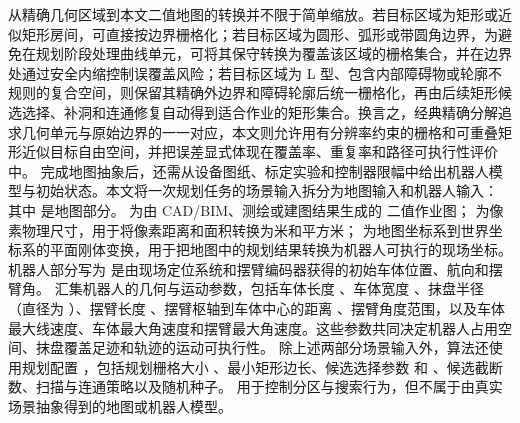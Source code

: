 {}从精确几何区域到本文二值地图的转换并不限于简单缩放。若目标区域为矩形或近似矩形房间，可直接按边界栅格化；若目标区域为圆形、弧形或带圆角边界，为避免在规划阶段处理曲线单元，可将其保守转换为覆盖该区域的栅格集合，并在边界处通过安全内缩控制误覆盖风险；若目标区域为 L 型、包含内部障碍物或轮廓不规则的复合空间，则保留其精确外边界和障碍轮廓后统一栅格化，再由后续矩形候选选择、补洞和连通修复自动得到适合作业的矩形集合。换言之，经典精确分解追求几何单元与原始边界的一一对应，本文则允许用有分辨率约束的栅格和可重叠矩形近似目标自由空间，并把误差显式体现在覆盖率、重复率和路径可执行性评价中。\markdownRendererInterblockSeparator
{}\markdownRendererParagraphSeparator
{}完成地图抽象后，还需从设备图纸、标定实验和控制器限幅中给出机器人模型与初始状态。本文将一次规划任务的场景输入拆分为地图输入和机器人输入：\markdownRendererParagraphSeparator
{}\markdownRendererParagraphSeparator
{}其中\markdownRendererParagraphSeparator
{}\markdownRendererParagraphSeparator
{}是地图部分。 为由 CAD/BIM、测绘或建图结果生成的  二值作业图； 为像素物理尺寸，用于将像素距离和面积转换为米和平方米； 为地图坐标系到世界坐标系的平面刚体变换，用于把地图中的规划结果转换为机器人可执行的现场坐标。\markdownRendererParagraphSeparator
{}机器人部分写为\markdownRendererParagraphSeparator
{}\markdownRendererParagraphSeparator
{} 是由现场定位系统和摆臂编码器获得的初始车体位置、航向和摆臂角。 汇集机器人的几何与运动参数，包括车体长度 、车体宽度 、抹盘半径 （直径为 ）、摆臂长度 、摆臂枢轴到车体中心的距离 、摆臂角度范围，以及车体最大线速度、车体最大角速度和摆臂最大角速度。这些参数共同决定机器人占用空间、抹盘覆盖足迹和轨迹的运动可执行性。\markdownRendererParagraphSeparator
{}除上述两部分场景输入外，算法还使用规划配置 ，包括规划栅格大小 、最小矩形边长、候选选择参数 \markdownRendererInlineMath{\alpha} 和 \markdownRendererInlineMath{\beta}、候选截断数、扫描与连通策略以及随机种子。 用于控制分区与搜索行为，但不属于由真实场景抽象得到的地图或机器人模型。\markdownRendererParagraphSeparator
